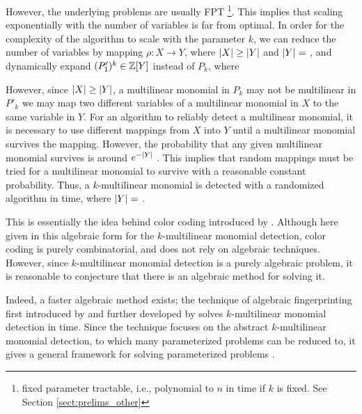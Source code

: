 However, the underlying problems are usually FPT
\footnote{fixed parameter tractable, i.e., 
polynomial to $n$ in time if $k$ is fixed. See Section \ref{sect:prelims_other}}. 
This implies that scaling exponentially 
with the number of variables is far from optimal. 
In order for the complexity of the algorithm to scale 
with the parameter $k$, we can reduce the number of variables 
by mapping $\rho \colon X \to Y$, where 
${\left\vert X\right\vert} \geq {\left\vert Y\right\vert}$ and ${\left\vert Y\right\vert} =$ , 
and dynamically expand $(P'_1)^k \in \mathbb Z[Y]$ instead of
$P_k$, where

However, since ${\left\vert X\right\vert} \geq {\left\vert Y\right\vert}$, 
a multilinear monomial in $P_k$ may not be multilinear in $P'_k$
we may map two different variables of a multilinear monomial in $X$ 
to the same variable in $Y$. 
For an algorithm to reliably detect a multilinear monomial, 
it is necessary to use different mappings 
from $X$ into $Y$ until a multilinear monomial survives the mapping. 
However, the probability that any given 
multilinear monomial survives
is around $e^{-{\left\vert Y\right\vert}}$ \cite{KouWil15}. 
This implies that 
 random mappings must be tried for a 
multilinear monomial to survive with a reasonable constant probability. Thus, a 
$k$-multilinear monomial is detected with a 
randomized algorithm in  time, where ${\left\vert Y\right\vert} =$ .

This is essentially the idea behind color coding 
introduced by \citeauthor{Alon95} \cite{Alon95}. 
Although here given in this algebraic form for 
the $k$-multilinear monomial detection, 
color coding is purely combinatorial, 
and does not rely on algebraic techniques. 
However, since $k$-multilinear monomial detection is a 
purely algebraic problem, it is reasonable to 
conjecture that there is an algebraic method for solving it.

Indeed, a faster algebraic method exists; the technique of algebraic fingerprinting 
first introduced by \citeauthor{Koutis08} \cite{Koutis08} and 
further developed by \citeauthor{Williams09} \cite{Williams09} 
solves $k$-multilinear monomial detection in  time. 
Since the technique focuses on the abstract $k$-multilinear monomial detection, 
to which many parameterized problems can be reduced to, 
it gives a general framework for 
solving parameterized problems \cite{KouWil15}.

